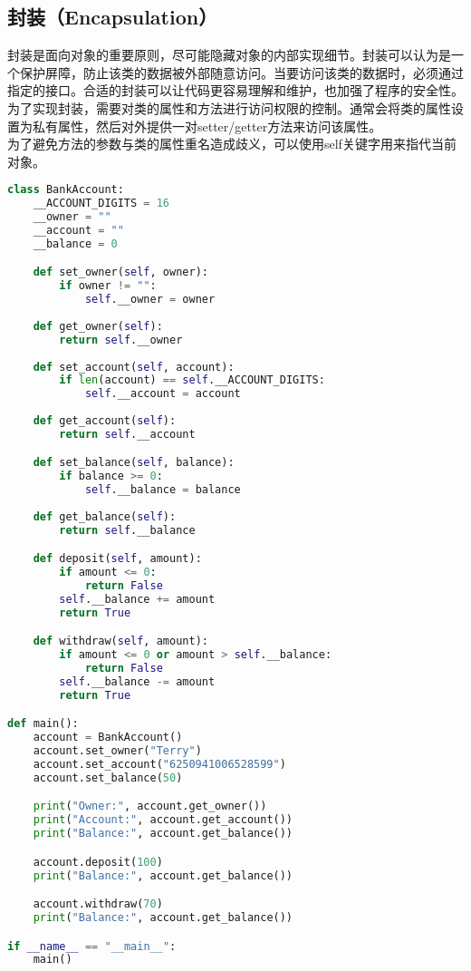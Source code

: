 \vspace{0.5cm}

\subsection{封装（Encapsulation）}

封装是面向对象的重要原则，尽可能隐藏对象的内部实现细节。封装可以认为是一个保护屏障，防止该类的数据被外部随意访问。当要访问该类的数据时，必须通过指定的接口。合适的封装可以让代码更容易理解和维护，也加强了程序的安全性。\\

为了实现封装，需要对类的属性和方法进行访问权限的控制。通常会将类的属性设置为私有属性，然后对外提供一对setter/getter方法来访问该属性。\\

为了避免方法的参数与类的属性重名造成歧义，可以使用self关键字用来指代当前对象。\\


\begin{lstlisting}[language=Python]
class BankAccount:
    __ACCOUNT_DIGITS = 16
    __owner = ""
    __account = ""
    __balance = 0

    def set_owner(self, owner):
        if owner != "":
            self.__owner = owner
    
    def get_owner(self):
        return self.__owner
    
    def set_account(self, account):
        if len(account) == self.__ACCOUNT_DIGITS:
            self.__account = account
    
    def get_account(self):
        return self.__account

    def set_balance(self, balance):
        if balance >= 0:
            self.__balance = balance
    
    def get_balance(self):
        return self.__balance

    def deposit(self, amount):
        if amount <= 0:
            return False
        self.__balance += amount
        return True

    def withdraw(self, amount):
        if amount <= 0 or amount > self.__balance:
            return False
        self.__balance -= amount
        return True

def main():
    account = BankAccount()
    account.set_owner("Terry")
    account.set_account("6250941006528599")
    account.set_balance(50)

    print("Owner:", account.get_owner())
    print("Account:", account.get_account())
    print("Balance:", account.get_balance())

    account.deposit(100)
    print("Balance:", account.get_balance())

    account.withdraw(70)
    print("Balance:", account.get_balance())

if __name__ == "__main__":
    main()
\end{lstlisting}

